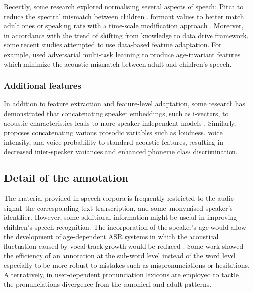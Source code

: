 Recently, some research explored normalising several aspects of speech: Pitch to reduce the spectral mismatch between children \cite{f0norm,pitchnorm,pitch_adapt_norm}, formant values to better match adult ones \cite{formant_norm} or speaking rate with a time-scale modification approach \cite{speaking_rate}.
Moreover, in accordance with the trend of shifting from knowledge to data drive framework, some recent studies attempted to use data-based feature adaptation. For example, \cite{adversarial-adapt1,adversarial-adapt2} used adversarial multi-task learning to produce age-invariant features which minimize the acoustic mismatch between adult and children's speech.

\subsubsection{Additional features}
In addition to feature extraction and feature-level adaptation, some research has demonstrated that concatenating speaker embeddings, such as i-vectors, to acoustic characteristics leads to more speaker-independent models \cite{ivector}.
Similarly, \cite{prosody_feat} proposes concatenating various prosodic variables such as loudness, voice intensity, and voice-probability to standard acoustic features, resulting in decreased inter-speaker variances and enhanced phoneme class discrimination.

\subsection{Detail of the annotation}
The material provided in speech corpora is frequently restricted to the audio signal, the corresponding text transcription, and some anonymised speaker's identifier. However, some additional information might be useful in improving children's speech recognition. The incorporation of the speaker's age would allow the development of age-dependent ASR systems in which the acoustical fluctuation caused by vocal track growth would be reduced \cite{linguistic-children}. 
Some work showed the efficiency of an annotation at the sub-word level instead of the word level \cite{subwords} especially to be more robust to mistakes such as mispronunciations or hesitations.
Alternatively, in \cite{pronunciation,pronunciation2} user-dependent pronunciation lexicons are
employed to tackle the pronunciations divergence from the canonical and adult patterns.

